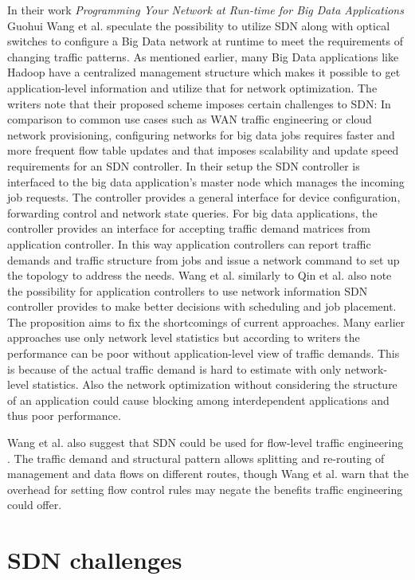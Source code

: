 \documentclass{acm_proc_article-sp}
\begin{document}
In their work \textit{Programming Your Network at Run-time for Big Data Applications} \cite{Wang:2012:PYN:2342441.2342462} Guohui Wang et al. speculate the possibility to utilize SDN along with optical switches to configure a Big Data network at runtime to meet the requirements of changing traffic patterns. As mentioned earlier, many Big Data applications like Hadoop have a centralized management structure which makes it possible to get application-level information and utilize that for network optimization. The writers note that their proposed scheme imposes certain challenges to SDN: In comparison to common use cases such as WAN traffic engineering or cloud network provisioning, configuring networks for big data jobs requires faster and more frequent flow table updates and that imposes scalability and update speed requirements for an SDN controller. In their setup the SDN controller is interfaced to the big data application's master node which manages the incoming job requests. The controller provides a general interface for device configuration, forwarding control and network state queries. For big data applications, the controller provides an interface for accepting traffic demand matrices from application controller. In this way application controllers can report traffic demands and traffic structure from jobs and issue a network command to set up the topology to address the needs. Wang et al. similarly to Qin et al.\cite{Scheduling} also note the possibility for application controllers to use network information SDN controller provides to make better decisions  with scheduling and job placement. The proposition aims to fix the shortcomings of current approaches. Many earlier approaches use only network level statistics but according to writers the performance can be poor without application-level view of traffic demands. This is because of the actual traffic demand is hard to estimate with only network-level statistics. Also the network optimization without considering the structure of an application could cause blocking among interdependent applications and thus poor performance. 

Wang et al. also suggest that SDN could be used for flow-level traffic engineering \cite{Wang:2012:PYN:2342441.2342462}. The traffic demand and structural pattern  allows splitting and re-routing of management and data flows on different routes, though Wang et al. warn that the overhead for setting flow control rules may negate the benefits traffic engineering could offer.

\section{SDN challenges}
\end{document}
